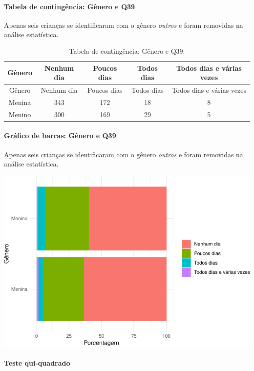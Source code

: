 \documentclass[]{article}
\let\oldparagraph\paragraph
\renewcommand{\paragraph}[1]{\oldparagraph{#1}\mbox{}}
\begin{document}
\cleardoublepage

\hypertarget{tabela-de-continguxeancia-guxeanero-e-q39}{%
\paragraph{Tabela de contingência: Gênero e Q39}\label{tabela-de-continguxeancia-guxeanero-e-q39}}

Apenas seis crianças se identificaram com o gênero \emph{outros} e foram removidas na análise estatística.

\begin{longtable}[]{@{}ccccc@{}}
\caption{\label{tab:unnamed-chunk-1498}Tabela de contingência: Gênero e Q39.}\tabularnewline
\toprule
Gênero & Nenhum dia & Poucos dias & Todos dias & Todos dias e várias vezes\tabularnewline
\midrule
\endfirsthead
\toprule
Gênero & Nenhum dia & Poucos dias & Todos dias & Todos dias e várias vezes\tabularnewline
\midrule
\endhead
Menina & 343 & 172 & 18 & 8\tabularnewline
Menino & 300 & 169 & 29 & 5\tabularnewline
\bottomrule
\end{longtable}

\hypertarget{gruxe1fico-de-barras-guxeanero-e-q39}{%
\paragraph{Gráfico de barras: Gênero e Q39}\label{gruxe1fico-de-barras-guxeanero-e-q39}}

Apenas seis crianças se identificaram com o gênero \emph{outros} e foram removidas na análise estatística.

\begin{center}\includegraphics[width=0.75\linewidth]{relatorio_covid19_files/figure-latex/unnamed-chunk-1499-1} \end{center}

\hypertarget{teste-qui-quadrado-128}{%
\paragraph{Teste qui-quadrado}\label{teste-qui-quadrado-128}}
\end{document}
